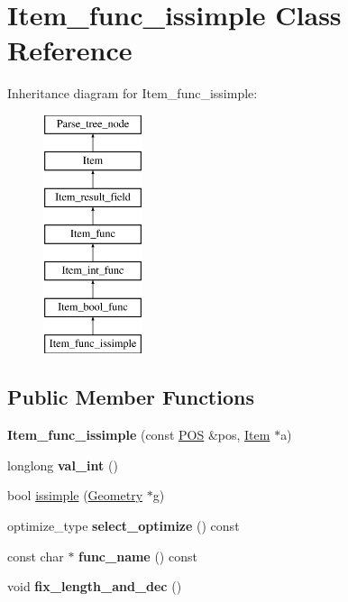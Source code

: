 \hypertarget{classItem__func__issimple}{}\section{Item\+\_\+func\+\_\+issimple Class Reference}
\label{classItem__func__issimple}
Inheritance diagram for Item\+\_\+func\+\_\+issimple\+:\begin{figure}[H]
\begin{center}
\leavevmode
\includegraphics[height=7.000000cm]{classItem__func__issimple}
\end{center}
\end{figure}
\subsection*{Public Member Functions}
\begin{DoxyCompactItemize}
\item 
\mbox{\label{classItem__func__issimple_a08d0cde7da9aacde786bf2cc8d266f8a}} 
{\bfseries Item\+\_\+func\+\_\+issimple} (const \mbox{\hyperlink{structYYLTYPE}{P\+OS}} \&pos, \mbox{\hyperlink{classItem}{Item}} $\ast$a)
\item 
\mbox{\label{classItem__func__issimple_a86dee27296075700505260b84e4ba03b}} 
longlong {\bfseries val\+\_\+int} ()
\item 
bool \mbox{\hyperlink{classItem__func__issimple_a4b5ac7a1b79f0629719c9fb1d87a72ec}{issimple}} (\mbox{\hyperlink{classGeometry}{Geometry}} $\ast$g)
\item 
\mbox{\label{classItem__func__issimple_afde3d999a51b482bbfe586ea79149ef9}} 
optimize\+\_\+type {\bfseries select\+\_\+optimize} () const
\item 
\mbox{\label{classItem__func__issimple_a118f724bf2950c877e57ab034ff7c864}} 
const char $\ast$ {\bfseries func\+\_\+name} () const
\item 
\mbox{\label{classItem__func__issimple_a0f8fa0af9b7df5b79ba65761a321f381}} 
void {\bfseries fix\+\_\+length\+\_\+and\+\_\+dec} ()
\end{DoxyCompactItemize}
